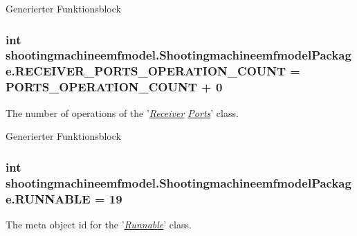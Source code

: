 Generierter Funktionsblock  \hypertarget{interfaceshootingmachineemfmodel_1_1_shootingmachineemfmodel_package_a784cd8ee08945f45f89ceb08f5a717e5}{
\subsubsection[{R\-E\-C\-E\-I\-V\-E\-R\-\_\-\-P\-O\-R\-T\-S\-\_\-\-O\-P\-E\-R\-A\-T\-I\-O\-N\-\_\-\-C\-O\-U\-N\-T}]{\setlength{\rightskip}{0pt plus 5cm}int shootingmachineemfmodel.\-Shootingmachineemfmodel\-Package.\-R\-E\-C\-E\-I\-V\-E\-R\-\_\-\-P\-O\-R\-T\-S\-\_\-\-O\-P\-E\-R\-A\-T\-I\-O\-N\-\_\-\-C\-O\-U\-N\-T = {\bf P\-O\-R\-T\-S\-\_\-\-O\-P\-E\-R\-A\-T\-I\-O\-N\-\_\-\-C\-O\-U\-N\-T} + 0}}\label{interfaceshootingmachineemfmodel_1_1_shootingmachineemfmodel_package_a784cd8ee08945f45f89ceb08f5a717e5}
The number of operations of the '{\itshape \hyperlink{interfaceshootingmachineemfmodel_1_1_receiver}{Receiver} \hyperlink{interfaceshootingmachineemfmodel_1_1_ports}{Ports}}' class.

Generierter Funktionsblock  \hypertarget{interfaceshootingmachineemfmodel_1_1_shootingmachineemfmodel_package_a677df60e3408957ae1a09879e817b6e4}{
\subsubsection[{R\-U\-N\-N\-A\-B\-L\-E}]{\setlength{\rightskip}{0pt plus 5cm}int shootingmachineemfmodel.\-Shootingmachineemfmodel\-Package.\-R\-U\-N\-N\-A\-B\-L\-E = 19}}\label{interfaceshootingmachineemfmodel_1_1_shootingmachineemfmodel_package_a677df60e3408957ae1a09879e817b6e4}
The meta object id for the '\hyperlink{classshootingmachineemfmodel_1_1impl_1_1_runnable_impl}{{\itshape Runnable}}' class.

